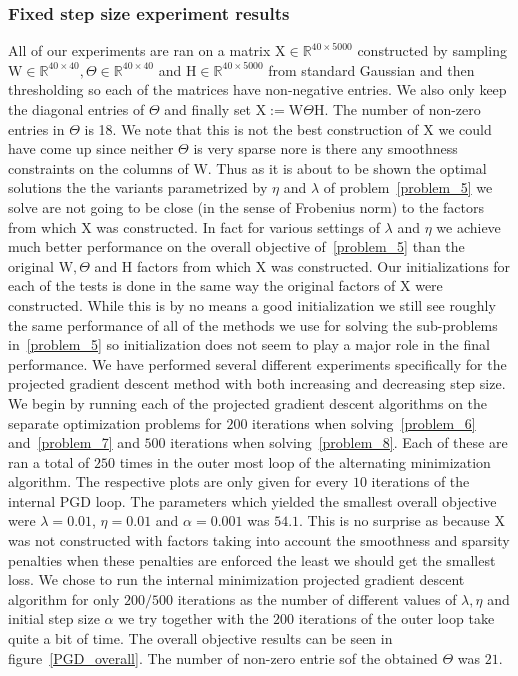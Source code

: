 \documentclass{article}
\newcommand{\0}{\mathrm{0}}
\newcommand{\1}{\mathrm{1}}
\renewcommand{\H}{\mathrm{H}}
\newcommand{\W}{\mathrm{W}}
\newcommand{\X}{\mathrm{X}}
\begin{document}
\subsubsection{Fixed step size experiment results}
%
All of our experiments are ran on a matrix $\X \in \mathbb{R}^{40\times 5000}$ constructed by sampling $\W \in \mathbb{R}^{40\times 40}, \Theta \in \mathbb{R}^{40\times 40}$ and $\H \in \mathbb{R}^{40\times 5000}$ from standard Gaussian and then thresholding so each of the matrices have non-negative entries. We also only keep the diagonal entries of $\Theta$ and finally set $\X := \W\Theta\H$. The number of non-zero entries in $\Theta$ is 18. We note that this is not the best construction of $\X$ we could have come up since neither $\Theta$ is very sparse nore is there any smoothness constraints on the columns of $\W$. Thus as it is about to be shown the optimal solutions the the variants parametrized by $\eta$ and $\lambda$ of problem~\ref{problem_5} we solve are not going to be close (in the sense of Frobenius norm) to the factors from which $\X$ was constructed. In fact for various settings of $\lambda$ and $\eta$ we achieve much better performance on the overall objective of~\ref{problem_5} than the original $\W,\Theta$ and $\H$ factors from which $\X$ was constructed. Our initializations for each of the tests is done in the same way the original factors of $\X$ were constructed. While this is by no means a good initialization we still see roughly the same performance of all of the methods we use for solving the sub-problems in~\ref{problem_5} so initialization does not seem to play a major role in the final performance. We have performed several different experiments specifically for the projected gradient descent method with both increasing and decreasing step size. We begin by running each of the projected gradient descent algorithms on the separate optimization problems for $200$ iterations when solving~\ref{problem_6} and~\ref{problem_7} and $500$ iterations when solving~\ref{problem_8}. Each of these are ran a total of $250$ times in the outer most loop of the alternating minimization algorithm. The respective plots are only given for every $10$ iterations of the internal PGD loop. The parameters which yielded the smallest overall objective were $\lambda = 0.01$, $\eta = 0.01$ and $\alpha = 0.001$ was $54.1$. This is no surprise as because $\X$ was not constructed with factors taking into account the smoothness and sparsity penalties when these penalties are enforced the least we should get the smallest loss. We chose to run the internal minimization projected gradient descent algorithm for only $200/500$ iterations as the number of different values of $\lambda,\eta$ and initial step size $\alpha$ we try together with the $200$ iterations of the outer loop take quite a bit of time. The overall objective results can be seen in figure~\ref{PGD_overall}. The number of non-zero entrie sof the obtained $\Theta$ was $21$. 
\end{document}
